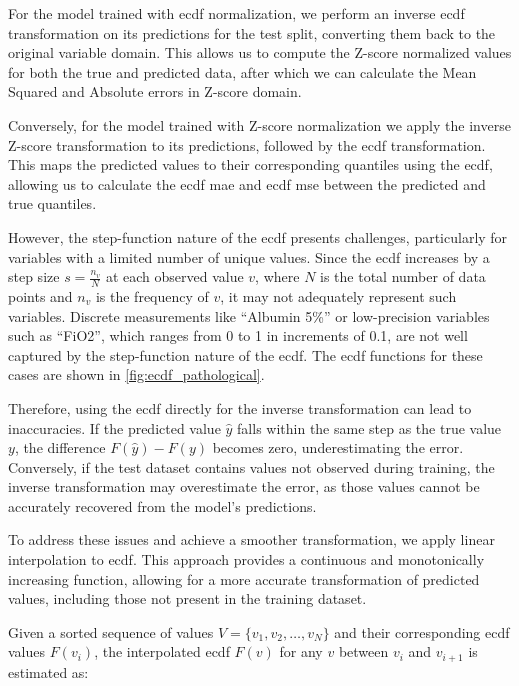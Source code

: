 For the model trained with \gls{ecdf} normalization, we perform an inverse \gls{ecdf} transformation on its predictions for the test split, converting them back to the original variable domain. This allows us to compute the Z-score normalized values for both the true and predicted data, after which we can calculate the Mean Squared and Absolute errors in Z-score domain.

Conversely, for the model trained with Z-score normalization we apply the inverse Z-score transformation to its predictions, followed by the \gls{ecdf} transformation. This maps the predicted values to their corresponding quantiles using the \gls{ecdf}, allowing us to calculate the \gls{ecdf} \gls{mae} and \gls{ecdf} \gls{mse} between the predicted and true quantiles.

However, the step-function nature of the \gls{ecdf} presents challenges, particularly for variables with a limited number of unique values. Since the \gls{ecdf} increases by a step size \( s = \frac{n_v}{N} \) at each observed value \( v \), where \( N \) is the total number of data points and \( n_v \) is the frequency of \( v \), it may not adequately represent such variables. Discrete measurements like ``Albumin 5\%'' or low-precision variables such as ``FiO2'', which ranges from \num{0} to \num{1} in increments of \num{0.1}, are not well captured by the step-function nature of the \gls{ecdf}. The \gls{ecdf} functions for these cases are shown in \cref{fig:ecdf_pathological}.

Therefore, using the \gls{ecdf} directly for the inverse transformation can lead to inaccuracies. If the predicted value \( \hat{y} \) falls within the same step as the true value \( y \), the difference \( F(\hat{y}) - F(y) \) becomes zero, underestimating the error. Conversely, if the test dataset contains values not observed during training, the inverse transformation may overestimate the error, as those values cannot be accurately recovered from the model's predictions.

To address these issues and achieve a smoother transformation, we apply linear interpolation to \gls{ecdf}. This approach provides a continuous and monotonically increasing function, allowing for a more accurate transformation of predicted values, including those not present in the training dataset.

Given a sorted sequence of values \( V = \{v_1, v_2, \dots, v_N\} \) and their corresponding \gls{ecdf} values \( F(v_i) \), the interpolated \gls{ecdf} \( F(v) \) for any \( v \) between \( v_i \) and \( v_{i+1} \) is estimated as:

